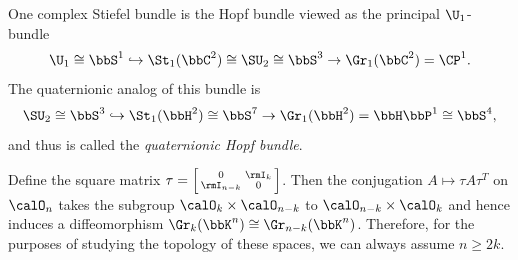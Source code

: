 \begin{example}
    One complex Stiefel bundle is the Hopf bundle viewed as the principal $\U_1$-bundle
    \[\U_1\cong\bbS^1\hookrightarrow \St_1(\bbC^2)\cong \SU_2\cong\bbS^3\to \Gr_1(\bbC^2)=\CP^1.\]
    The quaternionic analog of this bundle is 
    \[\SU_2\cong \bbS^3\hookrightarrow \St_1(\bbH^2)\cong \bbS^7\to \Gr_1(\bbH^2)=\bbH\bbP^1\cong \bbS^4,\]
    and thus is called the \emph{quaternionic Hopf bundle}.
\end{example}

\begin{rem}
   Define the square matrix $\tau=\left[\begin{smallmatrix}
       0&\rmI_k\\\rmI_{n-k}&0
   \end{smallmatrix}\right]$. 
   Then the conjugation $A\mapsto \tau A\tau^T$ on $\calO_n$ takes the subgroup $\calO_k\times\calO_{n-k}$ to $\calO_{n-k}\times\calO_{k}$ and hence induces a diffeomorphism $\Gr_k(\bbK^n)\cong \Gr_{n-k}(\bbK^n)$. Therefore, for the purposes of studying the topology of these spaces, we can always assume $n\geq 2k$.
\end{rem}


